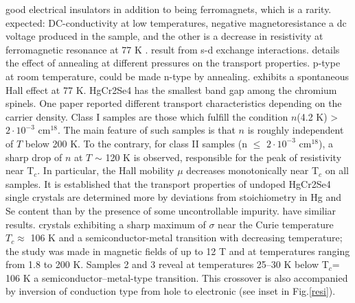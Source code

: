 \documentclass[preprint,pre,floats,aps,amsmath,amssymb]{revtex4}
\begin{document}
good electrical insulators in addition to being ferromagnets, which is a rarity.
expected: DC-conductivity at low temperatures, negative magnetoresistance
 a dc voltage produced in the sample, and the other is a decrease in resistivity at ferromagnetic resonance at 77 K \cite{toda}. result from s-d exchange interactions.
 \cite{goldstein} details the effect of annealing at different pressures on the transport properties. p-type at room temperature, could be made n-type by annealing. exhibits a spontaneous Hall effect at 77 K. HgCr2Se4 has the smallest band gap among the chromium spinels. One paper \cite{selmi} reported different transport characteristics depending on the carrier density. Class I samples are those which fulfill the condition $n$(4.2 K) \textgreater~$2\cdot10^{-3}$ cm$^{18}$. The main feature of such samples is that $n$ is roughly independent of $T$ below 200 K. To the contrary, for class II samples (n $\le$ $2\cdot10^{-3}$ cm$^{18}$), a sharp drop of $n$ at $T$ $\sim$ 120 K is observed, responsible for the peak of resistivity near T$_c$. In particular, the Hall mobility $\mu$ decreases monotonically near T$_c$ on all samples. It is established\cite{veselago} that the transport properties of undoped HgCr2Se4 single crystals are determined more by deviations from stoichiometry in Hg and Se content than by the presence of some uncontrollable impurity. \cite{solin1}\cite{solin2} have similiar results. crystals exhibiting a sharp maximum of $\sigma$ near the Curie temperature $T_c \approx$ 106 K and a semiconductor-metal transition with decreasing temperature; the study was made in magnetic fields of up to 12 T and at temperatures ranging from 1.8 to 200 K. Samples 2 and 3 reveal at temperatures 25–30 K below T$_c$= 106 K a semiconductor–metal-type transition. This crossover is also accompanied by inversion of conduction type from hole to electronic (see inset in Fig.\ref{resi}).
\end{document}
